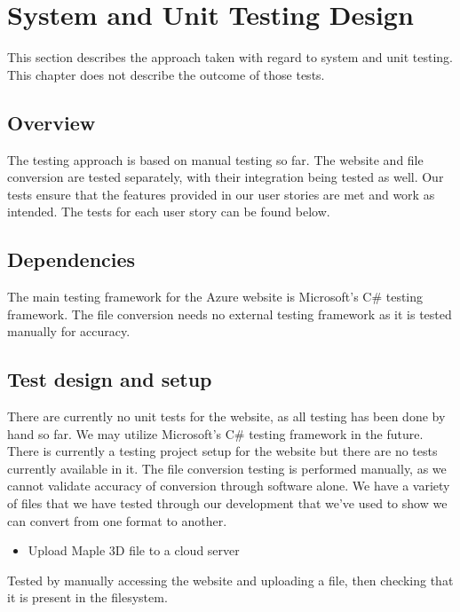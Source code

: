 

\chapter{System and Unit Testing Design}

This section describes the approach taken with regard to system and unit testing.    This chapter does not describe the outcome of those tests.    

\section{Overview}
The testing approach is based on manual testing so far. 
The website and file conversion are tested separately, with their integration being tested as well.
Our tests ensure that the features provided in our user stories are met and work as intended.
The tests for each user story can be found below.

\section{Dependencies}
The main testing framework for the Azure website is Microsoft's C\# testing framework. 
The file conversion needs no external testing framework as it is tested manually for accuracy.

\section{Test design and setup}
There are currently no unit tests for the website, as all testing has been done by hand so far.
We may utilize Microsoft's C\# testing framework in the future. There is currently a testing project setup for the website but there are no tests currently available in it.
The file conversion testing is performed manually, as we cannot validate accuracy of conversion through software alone. We have a variety of files that we have tested through our development that we've used to show we can convert from one format to another.

\begin{itemize} \item Upload Maple 3D file to a cloud server \end{itemize}
\hspace{7mm}    
    Tested by manually accessing the website and uploading a file, then checking that it is present in the filesystem.

